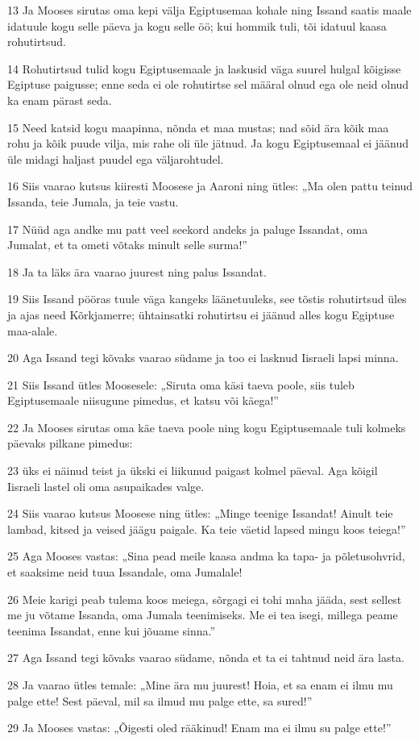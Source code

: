\par 13 Ja Mooses sirutas oma kepi välja Egiptusemaa kohale ning Issand saatis maale idatuule kogu selle päeva ja kogu selle öö; kui hommik tuli, tõi idatuul kaasa rohutirtsud.
\par 14 Rohutirtsud tulid kogu Egiptusemaale ja laskusid väga suurel hulgal kõigisse Egiptuse paigusse; enne seda ei ole rohutirtse sel määral olnud ega ole neid olnud ka enam pärast seda.
\par 15 Need katsid kogu maapinna, nõnda et maa mustas; nad sõid ära kõik maa rohu ja kõik puude vilja, mis rahe oli üle jätnud. Ja kogu Egiptusemaal ei jäänud üle midagi haljast puudel ega väljarohtudel.
\par 16 Siis vaarao kutsus kiiresti Moosese ja Aaroni ning ütles: „Ma olen pattu teinud Issanda, teie Jumala, ja teie vastu.
\par 17 Nüüd aga andke mu patt veel seekord andeks ja paluge Issandat, oma Jumalat, et ta ometi võtaks minult selle surma!”
\par 18 Ja ta läks ära vaarao juurest ning palus Issandat.
\par 19 Siis Issand pööras tuule väga kangeks läänetuuleks, see tõstis rohutirtsud üles ja ajas need Kõrkjamerre; ühtainsatki rohutirtsu ei jäänud alles kogu Egiptuse maa-alale.
\par 20 Aga Issand tegi kõvaks vaarao südame ja too ei lasknud Iisraeli lapsi minna.
\par 21 Siis Issand ütles Moosesele: „Siruta oma käsi taeva poole, siis tuleb Egiptusemaale niisugune pimedus, et katsu või käega!”
\par 22 Ja Mooses sirutas oma käe taeva poole ning kogu Egiptusemaale tuli kolmeks päevaks pilkane pimedus:
\par 23 üks ei näinud teist ja ükski ei liikunud paigast kolmel päeval. Aga kõigil Iisraeli lastel oli oma asupaikades valge.
\par 24 Siis vaarao kutsus Moosese ning ütles: „Minge teenige Issandat! Ainult teie lambad, kitsed ja veised jäägu paigale. Ka teie väetid lapsed mingu koos teiega!”
\par 25 Aga Mooses vastas: „Sina pead meile kaasa andma ka tapa- ja põletusohvrid, et saaksime neid tuua Issandale, oma Jumalale!
\par 26 Meie karigi peab tulema koos meiega, sõrgagi ei tohi maha jääda, sest sellest me ju võtame Issanda, oma Jumala teenimiseks. Me ei tea isegi, millega peame teenima Issandat, enne kui jõuame sinna.”
\par 27 Aga Issand tegi kõvaks vaarao südame, nõnda et ta ei tahtnud neid ära lasta.
\par 28 Ja vaarao ütles temale: „Mine ära mu juurest! Hoia, et sa enam ei ilmu mu palge ette! Sest päeval, mil sa ilmud mu palge ette, sa sured!”
\par 29 Ja Mooses vastas: „Õigesti oled rääkinud! Enam ma ei ilmu su palge ette!”

